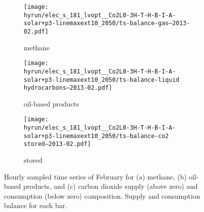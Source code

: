 \begin{figure}
    \centering

    \begin{subfigure}[t]{\textwidth}
        \centering
        \caption{methane}
        \texttt{[image: \\hyrun/elec\_s\_181\_lvopt\_\_Co2L0-3H-T-H-B-I-A-solar+p3-linemaxext10\_2050/ts-balance-gas--2013-02.pdf]}
    \end{subfigure}
    \begin{subfigure}[t]{\textwidth}
        \centering
        \caption{oil-based products}
        \texttt{[image: \\hyrun/elec\_s\_181\_lvopt\_\_Co2L0-3H-T-H-B-I-A-solar+p3-linemaxext10\_2050/ts-balance-liquid hydrocarbons--2013-02.pdf]}
    \end{subfigure}
    \begin{subfigure}[t]{\textwidth}
        \centering
        \caption{stored \co}
        \texttt{[image: \\hyrun/elec\_s\_181\_lvopt\_\_Co2L0-3H-T-H-B-I-A-solar+p3-linemaxext10\_2050/ts-balance-co2 stored--2013-02.pdf]}
    \end{subfigure}

    \caption{Hourly sampled time series of February for (a) methane, (b) oil-based products, and (c) carbon dioxide supply (above zero) and consumption (below zero) composition. Supply and consumption balance for each bar.}
    \label{fig:output-ts-4}
\end{figure}


